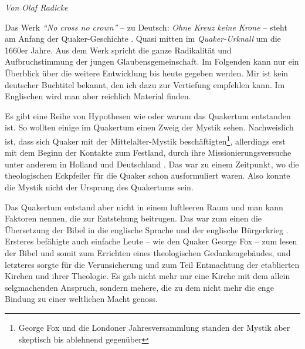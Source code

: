 


\begin{flushright}
\begin{footnotesize}
\textit{Von Olaf Radicke}
\end{footnotesize}
\end{flushright}
\smallskip

Das Werk \textit{"`No cross no crown"'} -- zu Deutsch: \textit{Ohne Kreuz keine
Krone} --
steht am Anfang der Quaker-Geschichte . Quasi mitten im
\textit{Quaker-Urknall}
um die 1660er Jahre. Aus dem Werk spricht die ganze Radikalität und
Aufbruchstimmung der jungen Glaubensgemeinschaft. Im Folgenden kann nur ein
Überblick über die weitere Entwicklung bis heute gegeben werden. Mir ist kein
deutscher Buchtitel bekannt, den ich dazu zur Vertiefung empfehlen kann. Im
Englischen wird man aber reichlich Material finden.

\medskip

Es gibt eine Reihe von Hypothesen wie oder warum das Quakertum
entstanden ist.
So
wollten einige im Quakertum einen Zweig der Mystik  sehen.
Nachweislich ist, dass
sich Quaker mit der Mittelalter-Mystik beschäftigten\footnote{George Fox und die
Londoner Jahresversammlung standen der Mystik aber skeptisch bis ablehnend
gegenüber}, allerdings erst mit dem
Beginn der Kontakte zum Festland, durch ihre Missionierungsversuche
 unter
anderem in Holland  und Deutschland
. Das war zu einem Zeitpunkt, wo die
theologischen Eckpfeiler für die Quaker schon ausformuliert waren. Also konnte
die Mystik nicht der Ursprung des Quakertums sein.

\medskip

Das Quakertum entstand aber nicht in einem luftleeren Raum und man kann Faktoren
nennen,
die zur Entstehung beitrugen. Das war zum einen die Übersetzung der Bibel
in die englische Sprache und der englische Bürgerkrieg
. Ersteres befähigte auch
einfache Leute -- wie den Quaker George Fox  -- zum
lesen der Bibel und somit zum
Errichten eines theologischen Gedankengebäudes, und letzteres sorgte für die
Verunsicherung und zum Teil Entmachtung der etablierten Kirchen
 und ihrer
Theologie. Es gab nicht mehr nur eine Kirche mit dem allein selgmachenden Anspruch, sondern mehere, die zu dem nicht mehr die enge Bindung zu einer weltlichen Macht genoss.

